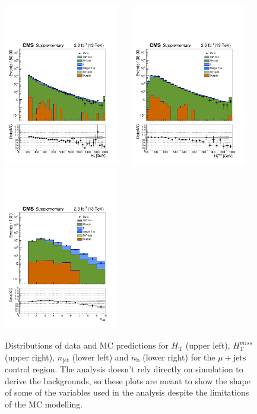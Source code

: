 \clearpage
\begin{figure}[tbhp]
    \caption{ 
    Distributions of data and MC predictions for $H_{\mathrm{T}}$
    (upper left), $H_{\mathrm{T}}^{miss}$ (upper right),
    $n_{\mathrm{jet}}$ (lower left) and $n_{\mathrm{b}}$ (lower right)  
    for the $\mu+\mathrm{jets}$ control region. 
    The analysis doesn't rely directly on simulation to derive the backgrounds, 
    so these plots are meant to show the shape of some of the variables used in the analysis despite the limitations 
    of the MC modelling. 
    \label{fig:data-MC_plots_SingleMu} }
  \begin{center}
     \includegraphics[width=0.45\textwidth]{SingleMu_ht40_all_all_aux} ~~
     \includegraphics[width=0.45\textwidth]{SingleMu_mht40_pt_all_all_aux} \\
     \includegraphics[width=0.45\textwidth]{SingleMu_nJet40_all_all_aux} ~~

\end{center}
\end{figure}
